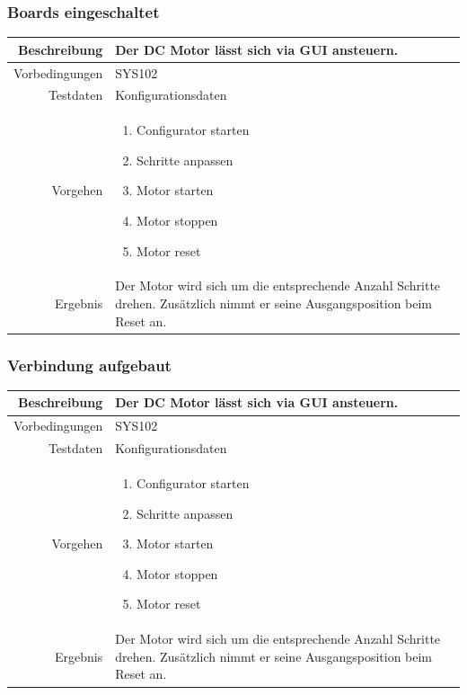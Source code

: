 \subsubsection{Boards eingeschaltet}
\begin{table}[h!]
	\renewcommand{\arraystretch}{1.5}
	\begin{tabular}{|r|p{14cm}|}
		\hline Beschreibung & Der DC Motor lässt sich via GUI ansteuern. \\ 
		\hline Vorbedingungen & SYS102 \\ 
		\hline Testdaten & Konfigurationsdaten \\ 
		\hline Vorgehen & 
		\begin{enumerate}
			\item Configurator starten
			\item Schritte anpassen
			\item Motor starten
			\item Motor stoppen
			\item Motor reset
		\end{enumerate} \\ 
		\hline Ergebnis & Der Motor wird sich um die entsprechende Anzahl Schritte drehen. Zusätzlich nimmt er seine Ausgangsposition beim Reset an. \\ 
		\hline 
	\end{tabular}
\end{table}

\subsubsection{Verbindung aufgebaut}
\begin{table}[h!]
	\renewcommand{\arraystretch}{1.5}
	\begin{tabular}{|r|p{14cm}|}
		\hline Beschreibung & Der DC Motor lässt sich via GUI ansteuern. \\ 
		\hline Vorbedingungen & SYS102 \\ 
		\hline Testdaten & Konfigurationsdaten \\ 
		\hline Vorgehen & 
		\begin{enumerate}
			\item Configurator starten
			\item Schritte anpassen
			\item Motor starten
			\item Motor stoppen
			\item Motor reset
		\end{enumerate} \\ 
		\hline Ergebnis & Der Motor wird sich um die entsprechende Anzahl Schritte drehen. Zusätzlich nimmt er seine Ausgangsposition beim Reset an. \\ 
		\hline 
	\end{tabular}
\end{table}

